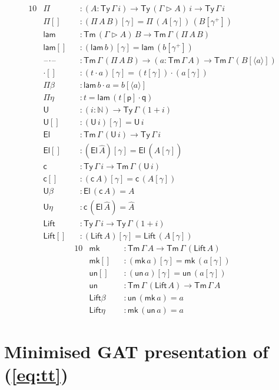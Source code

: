 \documentclass[sigplan,10pt,anonymous,review]{acmart}\settopmatter{printfolios=true,printccs=false,printacmref=false}
\newcommand{\ra}{\rightarrow}
\newcommand{\Ty}{\mathsf{Ty}}
\newcommand{\Tm}{\mathsf{Tm}}
\newcommand{\p}{\mathsf{p}}
\newcommand{\q}{\mathsf{q}}
\newcommand{\ext}{\mathop{\triangleright}}
\newcommand{\N}{\mathbb{N}}
\newcommand{\lam}{\mathsf{lam}}
\newcommand{\U}{\mathsf{U}}
\newcommand{\El}{\mathsf{El}}
\newcommand{\cd}{\mathsf{c}}
\newcommand{\blank}{\mathord{\hspace{1pt}\text{--}\hspace{1pt}}} %
\newcommand{\Lift}{\mathsf{Lift}}
\newcommand{\mk}{\mathsf{mk}}
\newcommand{\un}{\mathsf{un}}
\begin{document}
\begin{alignat*}{10}
  & \Pi && : (A:\Ty\,\Gamma\,i)\ra\Ty\,(\Gamma\ext A)\,i\ra\Ty\,\Gamma\,i \\
  & \Pi[] && : (\Pi\,A\,B)[\gamma] = \Pi\,(A[\gamma])\,(B[\gamma^+]) \\
  & \lam && : \Tm\,(\Gamma\ext A)\,B\ra\Tm\,\Gamma\,(\Pi\,A\,B) \\
  & \lam[] && : (\lam\,b)[\gamma] = \lam\,(b[\gamma^+]) \\
  & \blank\cdot\blank && : \Tm\,\Gamma\,(\Pi\,A\,B)\ra(a:\Tm\,\Gamma\,A)\ra\Tm\,\Gamma\,(B[\langle a\rangle]) \\
  & {\cdot}[] && : (t\cdot a)[\gamma] = (t[\gamma])\cdot(a[\gamma]) \\
  & \Pi\beta && : \lam\,b\cdot a = b[\langle a\rangle] \\
  & \Pi\eta && : t = \lam\,(t[\p]\cdot\q) \\
  & \U && : (i:\N)\ra\Ty\,\Gamma\,(1+i) \\
  & \U[] && : (\U\,i)[\gamma] = \U\,i \\  
  & \El && : \Tm\,\Gamma\,(\U\,i) \ra \Ty\,\Gamma\,i \\
  & \El[] && : (\El\,\hat{A})[\gamma] = \El\,(\hat{A}[\gamma]) \\
  & \cd && : \Ty\,\Gamma\,i\ra\Tm\,\Gamma\,(\U\,i) \\
  & \cd[] && : (\cd\,A)[\gamma] = \cd\,(A[\gamma]) \\
  & \U\beta && : \El\,(\cd\,A) = A \\
  & \U\eta && : \cd\,(\El\,\hat{A}) = \hat{A} \\
  & \Lift && : \Ty\,\Gamma\,i\ra\Ty\,\Gamma\,(1+i) \\
  & \Lift[] && : (\Lift\,A)[\gamma] = \Lift\,(A[\gamma])
\end{alignat*}
\begin{alignat*}{10}
  & \mk && : \Tm\,\Gamma\,A \ra \Tm\,\Gamma\,(\Lift\,A) \\
  & \mk[] && : (\mk\,a)[\gamma] = \mk\,(a[\gamma]) \\
  & \un[] && : (\un\,a)[\gamma] = \un\,(a[\gamma]) \\
  & \un && : \Tm\,\Gamma\,(\Lift\,A) \ra \Tm\,\Gamma\,A \\
  & \Lift\beta && : \un\,(\mk\,a) = a \\
  & \Lift\eta && : \mk\,(\un\,a) = a
\end{alignat*}

\section{Minimised GAT presentation of (\ref{eq:tt})}
\label{app:minimisation}
\end{document}
